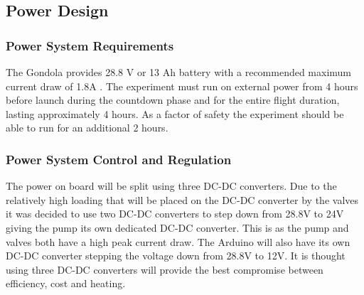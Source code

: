 \pagebreak
\subsection{Power Design}

\subsubsection{Power System Requirements}
\begin{centering}
The Gondola provides 28.8 V or 13 Ah battery with a recommended maximum current draw of 1.8A \cite{BexusManual}. The experiment must run on external power from 4 hours before launch during the countdown phase and for the entire flight duration, lasting approximately 4 hours. As a factor of safety the experiment should be able to run for an additional 2 hours. 
\end{centering}



\subsubsection{Power System Control and Regulation}
The power on board will be split using three DC-DC converters. Due to the relatively high loading that will be placed on the DC-DC converter by the valves it was decided to use two DC-DC converters to step down from 28.8V to 24V giving the pump its own dedicated DC-DC converter. This is as the pump and valves both have a high peak current draw. The Arduino will also have its own DC-DC converter stepping the voltage down from 28.8V to 12V. It is thought using three DC-DC converters will provide the best compromise between efficiency, cost and heating.

\raggedbottom
